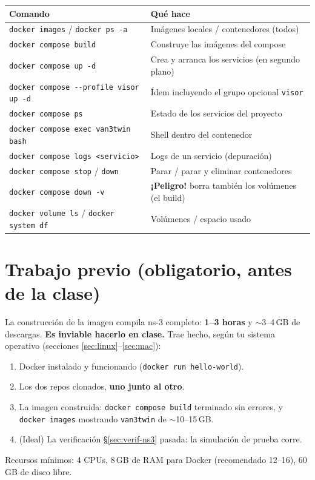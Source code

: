 \documentclass[11pt,a4paper]{article}
\begin{document}
\begin{center}
\small
\begin{tabular}{@{}ll@{}}
\toprule
\textbf{Comando} & \textbf{Qué hace} \\
\midrule
\texttt{docker images} / \texttt{docker ps -a} & Imágenes locales / contenedores (todos) \\
\texttt{docker compose build} & Construye las imágenes del compose \\
\texttt{docker compose up -d} & Crea y arranca los servicios (en segundo plano) \\
\texttt{docker compose -{}-profile visor up -d} & Ídem incluyendo el grupo opcional \texttt{visor} \\
\texttt{docker compose ps} & Estado de los servicios del proyecto \\
\texttt{docker compose exec van3twin bash} & Shell dentro del contenedor \\
\texttt{docker compose logs <servicio>} & Logs de un servicio (depuración) \\
\texttt{docker compose stop} / \texttt{down} & Parar / parar y eliminar contenedores \\
\texttt{docker compose down -v} & \textcolor{rojo}{\textbf{¡Peligro!}} borra también los volúmenes (el build) \\
\texttt{docker volume ls} / \texttt{docker system df} & Volúmenes / espacio usado \\
\bottomrule
\end{tabular}
\end{center}

\section{Trabajo previo (obligatorio, antes de la clase)}

\begin{previobox}
La construcción de la imagen compila ns-3 completo: \textbf{1--3 horas} y
$\sim$3--4\,GB de descargas. \textbf{Es inviable hacerlo en clase.} Trae
hecho, según tu sistema operativo (secciones \ref{sec:linux}--\ref{sec:mac}):
\begin{enumerate}[leftmargin=1.6em, itemsep=2pt]
  \item Docker instalado y funcionando (\texttt{docker run hello-world}).
  \item Los dos repos clonados, \textbf{uno junto al otro}.
  \item La imagen construida: \texttt{docker compose build} terminado sin
        errores, y \texttt{docker images} mostrando \texttt{van3twin} de
        $\sim$10--15\,GB.
  \item (Ideal) La verificación §\ref{sec:verif-ns3} pasada: la simulación de
        prueba corre.
\end{enumerate}
Recursos mínimos: 4 CPUs, 8\,GB de RAM para Docker (recomendado 12--16),
60\,GB de disco libre.
\end{previobox}
\end{document}
